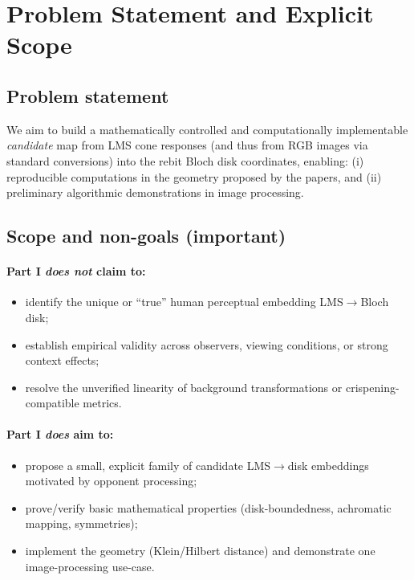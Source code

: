 \documentclass[11pt]{article}
\begin{document}
\section{Problem Statement and Explicit Scope}

\subsection{Problem statement}
We aim to build a mathematically controlled and computationally implementable \emph{candidate} map from LMS cone responses (and thus from RGB images via standard conversions) into the rebit Bloch disk coordinates, enabling:
(i) reproducible computations in the geometry proposed by the papers,
and (ii) preliminary algorithmic demonstrations in image processing.

\subsection{Scope and non-goals (important)}
\paragraph{Part I \emph{does not} claim to:}
\begin{itemize}[leftmargin=2.2em]
\item identify the unique or ``true'' human perceptual embedding LMS$\to$Bloch disk;
\item establish empirical validity across observers, viewing conditions, or strong context effects;
\item resolve the unverified linearity of background transformations or crispening-compatible metrics.
\end{itemize}

\paragraph{Part I \emph{does} aim to:}
\begin{itemize}[leftmargin=2.2em]
\item propose a small, explicit family of candidate LMS$\to$disk embeddings motivated by opponent processing;
\item prove/verify basic mathematical properties (disk-boundedness, achromatic mapping, symmetries);
\item implement the geometry (Klein/Hilbert distance) and demonstrate one image-processing use-case.
\end{itemize}
\end{document}
